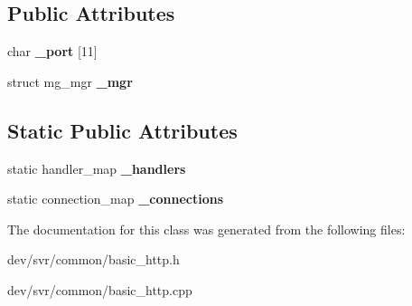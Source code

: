 \subsection*{Public Attributes}
\begin{DoxyCompactItemize}
\item 
\hypertarget{classBasicHttp_afda915018ed1eb551317547c68a4b7f4}{
char {\bfseries \_\-port} \mbox{[}11\mbox{]}}
\label{classBasicHttp_afda915018ed1eb551317547c68a4b7f4}

\item 
\hypertarget{classBasicHttp_aa3252a4b9cbe96cffe0d1b3edcc3382d}{
struct mg\_\-mgr {\bfseries \_\-mgr}}
\label{classBasicHttp_aa3252a4b9cbe96cffe0d1b3edcc3382d}

\end{DoxyCompactItemize}
\subsection*{Static Public Attributes}
\begin{DoxyCompactItemize}
\item 
\hypertarget{classBasicHttp_a4ffdf90b889ef8301dd7de8e0b17248d}{
static handler\_\-map {\bfseries \_\-handlers}}
\label{classBasicHttp_a4ffdf90b889ef8301dd7de8e0b17248d}

\item 
\hypertarget{classBasicHttp_a1315d635c2c7403693cbf2df1b97cc8e}{
static connection\_\-map {\bfseries \_\-connections}}
\label{classBasicHttp_a1315d635c2c7403693cbf2df1b97cc8e}

\end{DoxyCompactItemize}


The documentation for this class was generated from the following files:\begin{DoxyCompactItemize}
\item 
dev/svr/common/basic\_\-http.h\item 
dev/svr/common/basic\_\-http.cpp\end{DoxyCompactItemize}

